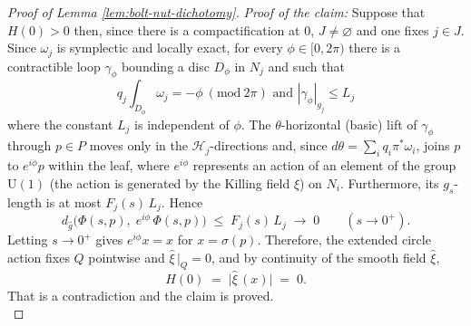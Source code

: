 \documentclass[11pt]{amsart}
\theoremstyle{plain}
\numberwithin{equation}{section}
\theoremstyle{definition}
\theoremstyle{remark}
\begin{document}
\begin{proof}[Proof of Lemma \ref{lem:bolt-nut-dichotomy}]
\emph{Proof of the claim:} Suppose that $H(0)>0$ then, since there is a compactification at $0$, $J \neq \varnothing$ and one fixes $j \in J$. Since $\omega_j$ is symplectic and locally exact, for every $\phi \in [0, 2\pi)$ there is a contractible loop $\gamma_\phi$ bounding a disc $D_\phi$ in $N_j$ and such that
 $$q_j \int_{D_\phi} \omega_j = -\phi \ (\mathrm{mod}\ 2\pi) \text{ and } |\gamma_\phi|_{g_j}\leq L_j $$
 where the constant $L_j$ is independent of $\phi$. The $\theta$-horizontal (basic) lift of $\gamma_\phi$ through $p \in P$ moves only in the $\mathcal{H}_j$-directions and, since $d\theta = \sum_i q_i \pi^* \omega_i$, joins $p$ to $e^{i\phi} p$ within the
leaf, where $e^{i\phi}$ represents an action of an element of the group $\mathrm{U}(1)$ (the action is generated by the Killing field $\xi$) on $N_i$. Furthermore, its $g_s$-length is at most $F_j(s)\, L_j$. Hence
\[
d_{\widehat{g}}\big( \Phi(s,p),\; e^{i\phi}\, \Phi(s,p) \big)
\;\leq\; F_j(s)\, L_j \;\longrightarrow\; 0 \qquad (s \to 0^+).
\]
Letting $s \to 0^+$ gives $e^{i\phi} x = x$ for $x = \sigma(p)$. Therefore, the extended circle action fixes $Q$ pointwise and
$\widehat{\xi}\,|_Q = 0$, and by continuity of the smooth field $\widehat{\xi}$,
\[
H(0) \;=\; %
\big| \widehat{\xi}\,(x) \big| \;=\; 0 .
\]
That is a contradiction and the claim is proved.\\





\end{proof}
\end{document}
